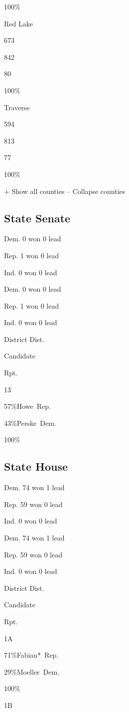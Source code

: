 100\%

Red Lake

673

842

80

100\%

Traverse

594

813

77

100\%

+ Show all counties -- Collapse counties

\hypertarget{state-senate}{%
\subsection{State Senate}\label{state-senate}}

Dem. 0 won 0 lead

Rep. 1 won 0 lead

Ind. 0 won 0 lead

Dem. 0 won 0 lead

Rep. 1 won 0 lead

Ind. 0 won 0 lead

District Dist.

Candidate

Rpt.

13

 57\%Howe~Rep.

 43\%Perske~Dem.

100\%

\hypertarget{state-house}{%
\subsection{State House}\label{state-house}}

Dem. 74 won 1 lead

Rep. 59 won 0 lead

Ind. 0 won 0 lead

Dem. 74 won 1 lead

Rep. 59 won 0 lead

Ind. 0 won 0 lead

District Dist.

Candidate

Rpt.

1A

 71\%Fabian*~Rep.

 29\%Moeller~Dem.

100\%

1B

